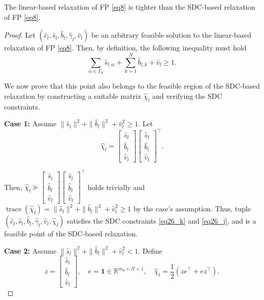 \documentclass[smallextended,referee,envcountsect,,numbers]{svjour3}
\begin{document}
\begin{theorem} \label{thm4_2}
The linear-based relaxation of FP \eqref{eq8} is tighter than the SDC-based relaxation of FP \eqref{eq8}.
\end{theorem}
\begin{proof}
Let $\left(\hat{c}_l, \hat{s}_l, \hat{b}_l, \hat{\gamma}_l, \hat{v}_l\right)$ be an arbitrary feasible solution to the linear-based relaxation of FP \eqref{eq8}. Then, by definition, the following inequality must hold
\begin{equation} \label{eq:sum1}
\sum_{\alpha \in \Gamma_d} \hat{s}_{l,\alpha} + \sum_{k=1}^N \hat{b}_{l,k} + \hat{v}_l \ge 1.
\end{equation}

We now prove that this point also belongs to the feasible region of the SDC-based relaxation by constructing a suitable matrix $\hat{\chi}_l$ and verifying the SDC constraints.

\textbf{Case 1:} Assume $\|\hat{s}_l\|^2 + \|\hat{b}_l\|^2 + \hat{v}_l^2 \ge 1$. Let
\begin{equation}
\hat{\chi}_l = 
\begin{bmatrix}
\hat{s}_l \\
\hat{b}_l \\
\hat{v}_l
\end{bmatrix}
\begin{bmatrix}
\hat{s}_l \\
\hat{b}_l \\
\hat{v}_l
\end{bmatrix}^\top.
\end{equation}

Then, $\hat{\chi}_l \succeq \begin{bmatrix} \hat{s}_l \\ \hat{b}_l \\ \hat{v}_l \end{bmatrix} \begin{bmatrix} \hat{s}_l \\ \hat{b}_l \\ \hat{v}_l \end{bmatrix}^\top$ holds trivially and $\operatorname{trace}(\hat{\chi}_l)=\|\hat{s}_l\|^2 + \|\hat{b}_l\|^2 + \hat{v}_l^2 \ge 1$ by the case's assumption. Thus, tuple $(\hat{c}_l, \hat{s}_l, \hat{b}_l, \hat{\gamma}_l, \hat{v}_l, \hat{\chi}_l)$ satisfies the SDC constraints \eqref{eq26_k} and \eqref{eq26_j}, and is a feasible point of the SDC-based relaxation.

\textbf{Case 2:} Assume $\|\hat{s}_l\|^2 + \|\hat{b}_l\|^2 + \hat{v}_l^2 < 1$. Define
\begin{equation} \label{eq143}
z = \begin{bmatrix}
\hat{s}_l \\
\hat{b}_l \\
\hat{v}_l
\end{bmatrix}, \quad
e = \mathbf{1} \in \mathbb{R}^{m_d + N + 1}, \quad
\hat{\chi}_l = \frac{1}{2}(z e^\top + e z^\top).
\end{equation}


\end{proof}
\end{document}
